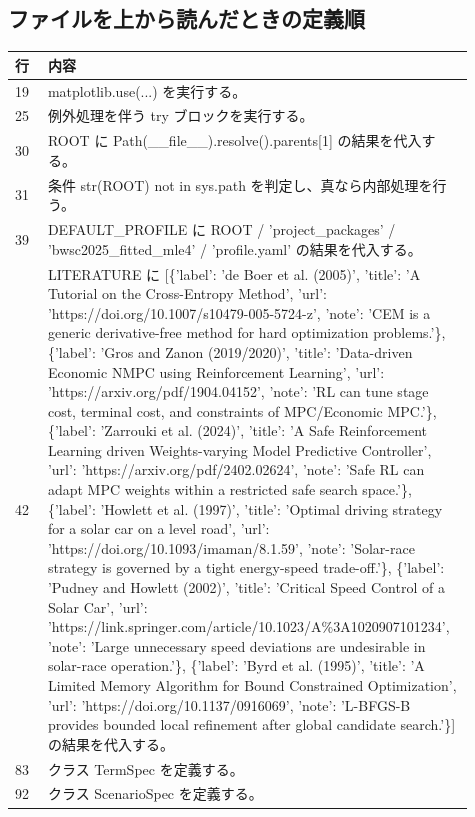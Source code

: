 \documentclass[a4paper,11pt]{article}
\begin{document}
        \subsection*{ファイルを上から読んだときの定義順}
            \begin{longtable}{p{0.07\linewidth} p{0.84\linewidth}}
            \toprule
            行 & 内容 \\
            \midrule
            19 & matplotlib.use(...) を実行する。 \\
25 & 例外処理を伴う try ブロックを実行する。 \\
30 & ROOT に Path(\_\_file\_\_).resolve().parents[1] の結果を代入する。 \\
31 & 条件 str(ROOT) not in sys.path を判定し、真なら内部処理を行う。 \\
39 & DEFAULT\_PROFILE に ROOT / 'project\_packages' / 'bwsc2025\_fitted\_mle4' / 'profile.yaml' の結果を代入する。 \\
42 & LITERATURE に [\{'label': 'de Boer et al. (2005)', 'title': 'A Tutorial on the Cross-Entropy Method', 'url': 'https://doi.org/10.1007/s10479-005-5724-z', 'note': 'CEM is a generic derivative-free method for hard optimization problems.'\}, \{'label': 'Gros and Zanon (2019/2020)', 'title': 'Data-driven Economic NMPC using Reinforcement Learning', 'url': 'https://arxiv.org/pdf/1904.04152', 'note': 'RL can tune stage cost, terminal cost, and constraints of MPC/Economic MPC.'\}, \{'label': 'Zarrouki et al. (2024)', 'title': 'A Safe Reinforcement Learning driven Weights-varying Model Predictive Controller', 'url': 'https://arxiv.org/pdf/2402.02624', 'note': 'Safe RL can adapt MPC weights within a restricted safe search space.'\}, \{'label': 'Howlett et al. (1997)', 'title': 'Optimal driving strategy for a solar car on a level road', 'url': 'https://doi.org/10.1093/imaman/8.1.59', 'note': 'Solar-race strategy is governed by a tight energy-speed trade-off.'\}, \{'label': 'Pudney and Howlett (2002)', 'title': 'Critical Speed Control of a Solar Car', 'url': 'https://link.springer.com/article/10.1023/A\%3A1020907101234', 'note': 'Large unnecessary speed deviations are undesirable in solar-race operation.'\}, \{'label': 'Byrd et al. (1995)', 'title': 'A Limited Memory Algorithm for Bound Constrained Optimization', 'url': 'https://doi.org/10.1137/0916069', 'note': 'L-BFGS-B provides bounded local refinement after global candidate search.'\}] の結果を代入する。 \\
83 & クラス TermSpec を定義する。 \\
92 & クラス ScenarioSpec を定義する。 \\

\end{longtable}
\end{document}
